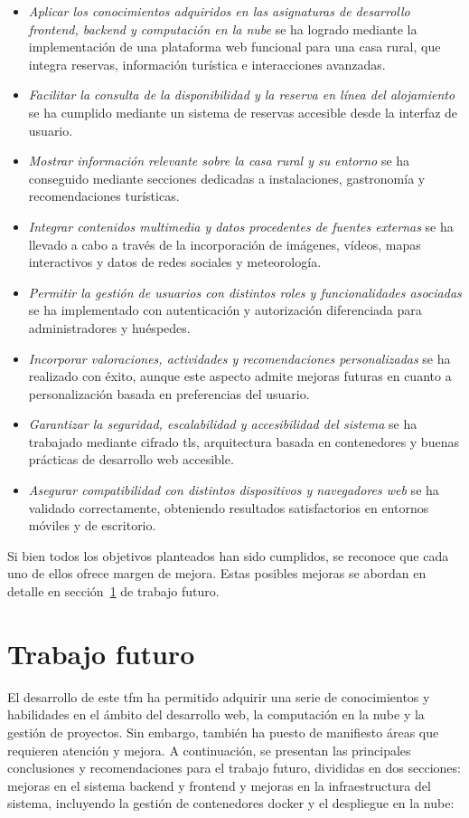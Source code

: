 \begin{itemize}
    \item \textit{Aplicar los conocimientos adquiridos en las asignaturas de desarrollo \gls{frontend}, \gls{backend} y computación en la nube} se ha logrado mediante la implementación de una plataforma web funcional para una casa rural, que integra reservas, información turística e interacciones avanzadas.
    \item \textit{Facilitar la consulta de la disponibilidad y la reserva en línea del alojamiento} se ha cumplido mediante un sistema de reservas accesible desde la interfaz de usuario.
    \item \textit{Mostrar información relevante sobre la casa rural y su entorno} se ha conseguido mediante secciones dedicadas a instalaciones, gastronomía y recomendaciones turísticas.
    \item \textit{Integrar contenidos multimedia y datos procedentes de fuentes externas} se ha llevado a cabo a través de la incorporación de imágenes, vídeos, mapas interactivos y datos de redes sociales y meteorología.
    \item \textit{Permitir la gestión de usuarios con distintos roles y funcionalidades asociadas} se ha implementado con autenticación y autorización diferenciada para administradores y huéspedes.
    \item \textit{Incorporar valoraciones, actividades y recomendaciones personalizadas} se ha realizado con éxito, aunque este aspecto admite mejoras futuras en cuanto a personalización basada en preferencias del usuario.
    \item \textit{Garantizar la seguridad, escalabilidad y accesibilidad del sistema} se ha trabajado mediante cifrado \gls{tls}, arquitectura basada en contenedores y buenas prácticas de desarrollo web accesible.
    \item \textit{Asegurar compatibilidad con distintos dispositivos y navegadores web} se ha validado correctamente, obteniendo resultados satisfactorios en entornos móviles y de escritorio.
\end{itemize}

Si bien todos los objetivos planteados han sido cumplidos, se reconoce que cada uno de ellos ofrece margen de mejora. Estas posibles mejoras se abordan en detalle en sección~\ref{sec:trabajo-futuro} de trabajo futuro.

\section{Trabajo futuro} \label{sec:trabajo-futuro}
El desarrollo de este \gls{tfm} ha permitido adquirir una serie de conocimientos y habilidades en el ámbito del desarrollo web, la computación en la nube y la gestión de proyectos. Sin embargo, también ha puesto de manifiesto áreas que requieren atención y mejora. A continuación, se presentan las principales conclusiones y recomendaciones para el trabajo futuro, divididas en dos secciones: mejoras en el sistema \gls{backend} y \gls{frontend} y mejoras en la infraestructura del sistema, incluyendo la gestión de contenedores \gls{docker} y el despliegue en la nube:

